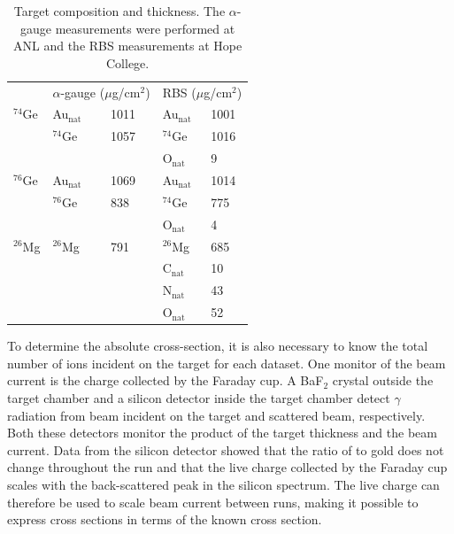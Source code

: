 \begin{table}[htp]
\centering
\begin{tabular}{lllll}
 & \multicolumn{2}{c}{$\alpha$-gauge ($\mu$g/cm$^2$)} & \multicolumn{2}{c}{RBS ($\mu$g/cm$^2$)} \\
\cline{2-3}\cline{4-5}
$^{74}$Ge & Au$_{\text{nat}}$ & 1011 & Au$_{\text{nat}}$ & 1001 \\
          & $^{74}$Ge & 1057 & $^{74}$Ge & 1016 \\
          &           &      & O$_{\text{nat}}$ & 9 \\[0.35cm]

$^{76}$Ge & Au$_{\text{nat}}$ & 1069 & Au$_{\text{nat}}$ & 1014 \\
          & $^{76}$Ge & 838 & $^{74}$Ge & 775 \\
          &           &      & O$_{\text{nat}}$ & 4 \\[0.35cm]

$^{26}$Mg & $^{26}$Mg & 791 & $^{26}$Mg & 685 \\
          &           &      & C$_{\text{nat}}$ & 10 \\
          &           &      & N$_{\text{nat}}$ & 43 \\
          &           &      & O$_{\text{nat}}$ & 52 \\
\end{tabular}
\caption{Target composition and thickness.  The $\alpha$-gauge measurements were performed at ANL and the RBS measurements at Hope College.}
\label{tab:targets}
\end{table}

To determine the absolute cross-section, it is also necessary to know the total number of  ions incident on the target for each dataset.  One monitor of the beam current is the charge collected by the Faraday cup.  A BaF$_2$ crystal outside the target chamber and a silicon detector inside the target chamber detect $\gamma$ radiation from beam incident on the target and scattered  beam, respectively.  Both these detectors monitor the product of the target thickness and the beam current.  Data from the silicon detector showed that the ratio of \GeTargets to gold does not change throughout the run and that the live charge collected by the Faraday cup scales with the back-scattered peak in the silicon spectrum.  The live charge can therefore be used to scale beam current between runs, making it possible to express \reaction cross sections in terms of the known \MgReaction cross section.

